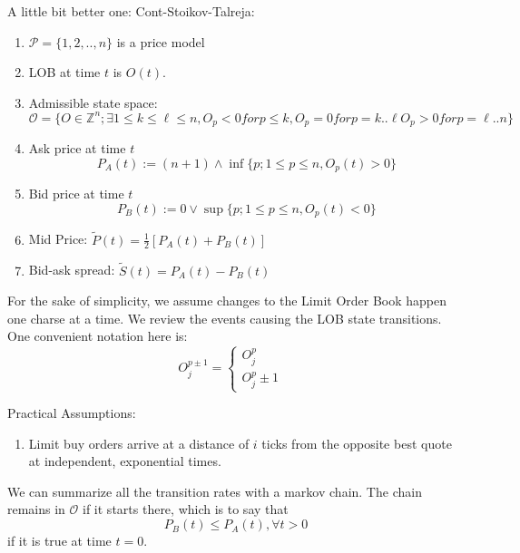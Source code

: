 A little bit better one: Cont-Stoikov-Talreja:
\begin{enumerate}
	\item $\mathcal{P}=\{1,2,..,n\}$ is a price model
	\item LOB at time $t$ is $O(t)$.
	\item Admissible state space:
	\begin{equation}
		\mathcal{O} = \{ O \in \mathbb{Z}^n; \exists 1\leq k \leq \ell \leq n, O_p<0 for p\leq k,
				O_p=0 for p=k..\ell
				O_p>0 for p=\ell..n 
				\}
	\end{equation}
	\item Ask price at time $t$
	\begin{equation}
		P_A(t):= (n+1)\wedge \inf \{ p; 1\leq p \leq n, O_p(t) > 0 \}
	\end{equation}
	\item Bid price at time $t$
	\begin{equation}
		P_B(t):= 0 \vee \sup \{ p; 1\leq p \leq n, O_p(t) < 0\}
	\end{equation}
	\item Mid Price: $\tilde{P}(t) = \frac12 [P_A(t) + P_B(t)]$
	\item Bid-ask spread: $\tilde{S}(t) = P_A(t) - P_B(t)$
	
\end{enumerate}

For the sake of simplicity, we assume changes to the Limit Order Book happen one charse at a time.
We review the events causing the LOB state transitions. One convenient notation here is:
\begin{equation}
	O^{p\pm 1}_j = \begin{cases}
		O_j^p   	& \\
		O_j^p \pm 1	& 
	\end{cases}
\end{equation}

Practical Assumptions:
\begin{enumerate}
	\item Limit buy orders arrive at a distance of $i$ ticks from the opposite best quote at independent, exponential times.
\end{enumerate}

We can summarize all the transition rates with a markov chain.
The chain remains in $\mathcal{O}$ if it starts there, which is to say that
\begin{equation}
	P_B(t) \leq P_A(t), \forall t > 0
\end{equation}
if it is true at time $t=0$.

